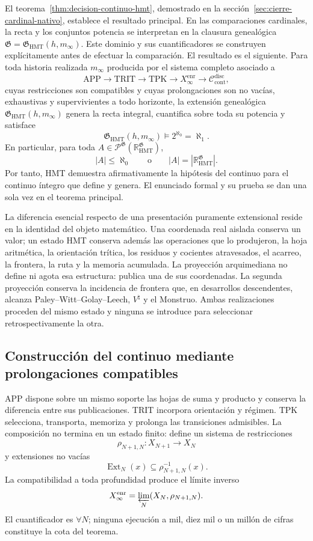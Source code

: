 El teorema~\ref{thm:decision-continuo-hmt}, demostrado en la
sección~\ref{sec:cierre-cardinal-nativo}, establece el resultado principal.
En las comparaciones cardinales, la recta y los conjuntos potencia se
interpretan en la clausura genealógica
\(\mathfrak G=\mathfrak G_{\mathrm{HMT}}(h,m_\infty)\). Este dominio y sus
cuantificadores se construyen explícitamente antes de efectuar la comparación.
El resultado es el siguiente. Para toda historia realizada \(m_\infty\)
producida por el sistema completo asociado a
\[
 \mathrm{APP}\longrightarrow\mathrm{TRIT}\longrightarrow\mathrm{TPK}
 \longrightarrow X_\infty^{\mathrm{enr}}
 \longrightarrow\mathcal C_{\mathrm{cont}}^{\mathrm{disc}},
\]
cuyas restricciones son compatibles y cuyas prolongaciones son no vacías,
exhaustivas y supervivientes a todo horizonte, la extensión genealógica
\(\mathfrak G_{\mathrm{HMT}}(h,m_\infty)\) genera la recta integral,
cuantifica sobre toda su potencia y satisface
\[
 \mathfrak G_{\mathrm{HMT}}(h,m_\infty)
 \models 2^{\aleph_0}=\aleph_1.
\]
En particular, para toda
\(A\in\mathcal P^{\mathfrak G}(\mathbb R_{\mathrm{HMT}}^{\mathfrak G})\),
\[
 |A|\leq\aleph_0
 \qquad\text{o}\qquad
 |A|=|\mathbb R_{\mathrm{HMT}}^{\mathfrak G}|.
\]
Por tanto, HMT demuestra afirmativamente la hipótesis del continuo para el
continuo íntegro que define y genera. El enunciado formal y su prueba se dan
una sola vez en el teorema principal.

La diferencia esencial respecto de una presentación puramente extensional
reside en la identidad del objeto matemático. Una coordenada real aislada
conserva un valor; un estado HMT conserva además las operaciones que lo
produjeron, la hoja aritmética, la orientación trítica, los residuos y
cocientes atravesados, el acarreo, la frontera, la ruta y la memoria acumulada.
La proyección arquimediana no define ni agota esa estructura: publica una de
sus coordenadas. La segunda proyección conserva la incidencia de frontera que,
en desarrollos descendentes, alcanza Paley--Witt--Golay--Leech,
\(V^\natural\) y el Monstruo. Ambas realizaciones proceden del mismo estado y
ninguna se introduce para seleccionar retrospectivamente la otra.

\subsection{Construcción del continuo mediante prolongaciones compatibles}

APP dispone sobre un mismo soporte las hojas de suma y producto y conserva la
diferencia entre sus publicaciones. TRIT incorpora orientación y régimen. TPK
selecciona, transporta, memoriza y prolonga las transiciones admisibles. La
composición no termina en un estado finito: define un sistema de restricciones
\[
 \rho_{N+1,N}:X_{N+1}\longrightarrow X_N
\]
y extensiones no vacías
\[
 \operatorname{Ext}_N(x)\subseteq\rho_{N+1,N}^{-1}(x).
\]
La compatibilidad a toda profundidad produce el límite inverso
\[
 X_\infty^{\mathrm{enr}}
 =\varprojlim_N(X_N,\rho_{N+1,N}).
\]
El cuantificador es \(\forall N\); ninguna ejecución a mil, diez mil o un
millón de cifras constituye la cota del teorema.


